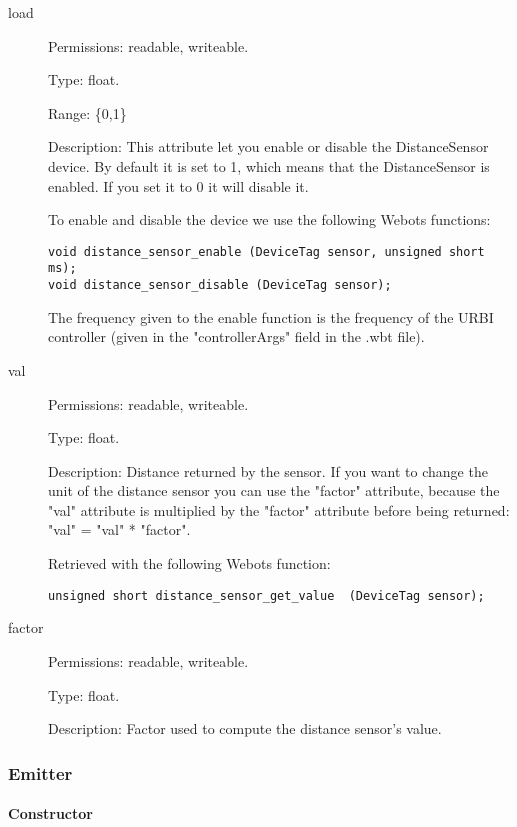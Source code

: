 \noindent
\begin{description}
\item[{load}]     Permissions: readable, writeable.


  Type: float.


  Range: \{0,1\}


  Description: This attribute let you enable or disable the
  DistanceSensor device.  By default it is set to 1, which means that
  the DistanceSensor is enabled. If you set it to 0 it will disable
  it.


  To enable and disable the device we use the following Webots
  functions:


\begin{lstlisting}
void distance_sensor_enable (DeviceTag sensor, unsigned short ms);
void distance_sensor_disable (DeviceTag sensor);
\end{lstlisting}

The frequency given to the enable function is the frequency of the
URBI controller (given in the "controllerArgs" field in the .wbt
file).

\item[{         val
 }]            Permissions: readable, writeable.


 Type: float.


 Description: Distance returned by the sensor. If you want to change
 the unit of the distance sensor you can use the "factor" attribute,
 because the "val" attribute is multiplied by the "factor" attribute
 before being returned: "val" = "val" * "factor".


 Retrieved with the following Webots function:


\begin{lstlisting}
unsigned short distance_sensor_get_value  (DeviceTag sensor);
\end{lstlisting}
\item[{factor}] Permissions: readable, writeable.


  Type: float.


  Description: Factor used to compute the distance sensor's value.

\end{description}

\subsubsection{Emitter}
\label{webots.uobjects.robotdevices.emitter}%

\paragraph{Constructor}
\label{webots.uobjects.robotdevices.emitter.constructor}%

